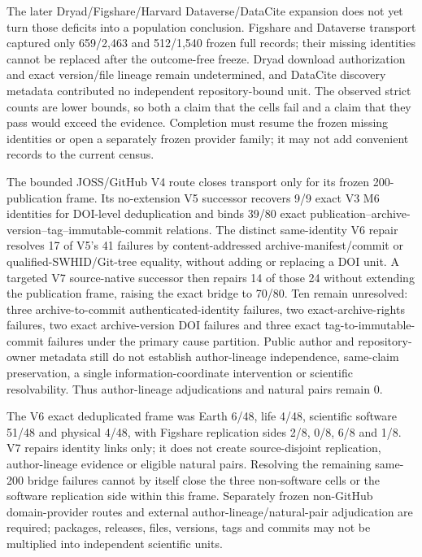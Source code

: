 The later Dryad/Figshare/Harvard Dataverse/DataCite expansion does not yet turn
those deficits into a population conclusion. Figshare and Dataverse transport
captured only 659/2,463 and 512/1,540 frozen full records; their missing
identities cannot be replaced after the outcome-free freeze. Dryad download
authorization and exact version/file lineage remain undetermined, and DataCite
discovery metadata contributed no independent repository-bound unit. The
observed strict counts are lower bounds, so both a claim that the cells fail
and a claim that they pass would exceed the evidence. Completion must resume
the frozen missing identities or open a separately frozen provider family; it
may not add convenient records to the current census.

The bounded JOSS/GitHub V4 route closes transport only for its frozen
200-publication frame. Its no-extension V5 successor recovers 9/9 exact V3 M6
identities for DOI-level deduplication and binds 39/80 exact
publication--archive-version--tag--immutable-commit relations. The distinct
same-identity V6 repair resolves 17 of V5's 41 failures by content-addressed
archive-manifest/commit or qualified-SWHID/Git-tree equality, without adding or
replacing a DOI unit. A targeted V7 source-native successor then repairs 14 of
those 24 without extending the publication frame, raising the exact bridge to
70/80. Ten remain unresolved: three archive-to-commit authenticated-identity
failures, two exact-archive-rights failures, two exact archive-version DOI
failures and three exact tag-to-immutable-commit failures under the primary
cause partition. Public author and repository-owner metadata still do not
establish author-lineage independence, same-claim preservation, a single
information-coordinate intervention or scientific resolvability. Thus
author-lineage adjudications and natural pairs remain 0.

The V6 exact deduplicated frame was Earth 6/48, life 4/48, scientific software
51/48 and physical 4/48, with Figshare replication sides 2/8, 0/8, 6/8 and
1/8. V7 repairs identity links only; it does not create source-disjoint
replication, author-lineage evidence or eligible natural pairs. Resolving the
remaining same-200 bridge failures cannot by itself close the three
non-software cells or the software replication side within this frame.
Separately frozen non-GitHub domain-provider
routes and external author-lineage/natural-pair adjudication are required;
packages, releases, files, versions, tags and commits may not be multiplied
into independent scientific units.

